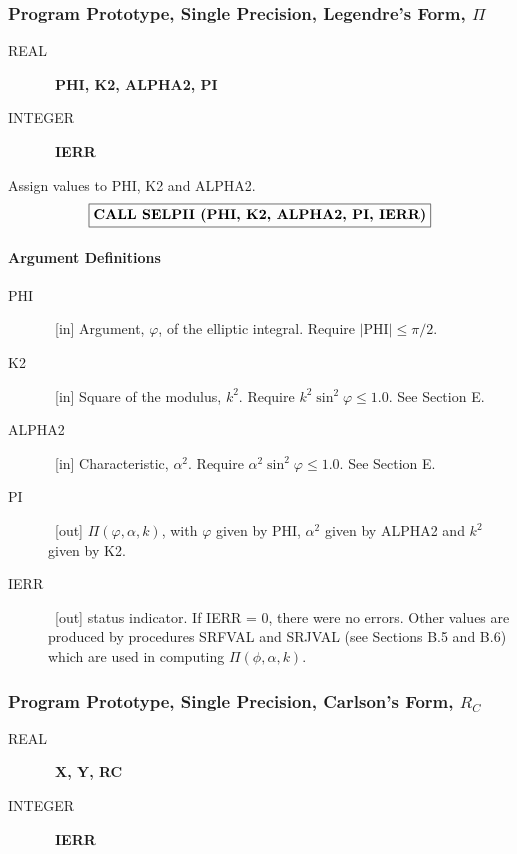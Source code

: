 \documentclass[twoside]{MATH77}
\begin{document}
\subsubsection{Program Prototype, Single Precision, Legendre's Form, $\Pi $}

\begin{description}
\item[REAL]  \ {\bf PHI, K2, ALPHA2, PI}

\item[INTEGER]  \ {\bf IERR}
\end{description}

Assign values to PHI, K2 and ALPHA2.
$$
\fbox{{\bf CALL SELPII (PHI, K2, ALPHA2, PI, IERR)}}
$$

\paragraph{Argument Definitions}

\begin{description}
\item[PHI]  \ [in] Argument, $\varphi $, of the elliptic integral. Require $|%
\text{PHI}|\leq \pi /2.$

\item[K2]  \ [in] Square of the modulus, $k^2$. Require $k^2\sin
^2\varphi \leq 1.0$. See Section E.

\item[ALPHA2]  \ [in] Characteristic, $\alpha ^2$. Require $\alpha
^2\sin ^2\varphi \leq 1.0$. See Section E.

\item[PI]  \ [out] $\Pi (\varphi ,\alpha ,k)$, with $\varphi $ given by PHI,
$\alpha ^2$ given by ALPHA2 and $k^2$ given by K2.

\item[IERR]  \ [out] status indicator.  If IERR = 0, there were no
errors.  Other values are produced by procedures SRFVAL and SRJVAL (see
Sections B.5 and B.6) which are
used in computing $\Pi (\phi, \alpha, k).$
\end{description}

\subsubsection{Program Prototype, Single Precision, Carlson's Form, $R_C$}

\begin{description}
\item[REAL]  \ {\bf X, Y, RC}

\item[INTEGER]  \ {\bf IERR}
\end{description}
\end{document}
